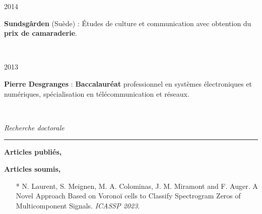 \documentclass[a4paper,10pt, french]{article}
\begin{document}
\noindent
\begin{minipage}{0.20\textwidth}
  \color{MyGray} 2014
\end{minipage}
\hfill
\begin{minipage}{0.70\textwidth}
  \textbf{Sundsgården} (Suède) : Études de culture et communication avec obtention du \textbf{prix de camaraderie}.
\end{minipage}\\
\vspace{2mm}

\noindent
\begin{minipage}{0.20\textwidth}
  \color{MyGray} 2013
\end{minipage}
\hfill
\begin{minipage}{0.70\textwidth}
  \textbf{Pierre Desgranges} : \textbf{Baccalauréat} professionnel en systèmes électroniques et numériques, spécialisation en télécommunication et réseaux.
\end{minipage}\\
\vspace{5mm}

\noindent
\textit{\Large \color{MyGray} \hspace{5mm} Recherche doctorale}
\vspace{2mm}
{\color{DefaultGray}\hrule height .1pt}
\vspace{4mm}

\textbf{Articles publiés,}
\nocite{*}


\vspace{5mm}


\textbf{Articles soumis,}
\begin{itemize}
  \setlength\itemsep{3mm}
    \item[*] N. Laurent, S. Meignen, M. A. Colominas, J. M. Miramont and F. Auger. A Novel Approach Based on Voronoï cells to Classify Spectrogram Zeros of Multicomponent Signals. \emph{ICASSP 2023}.
\end{itemize}
\vspace{5mm}
\newpage
\end{document}
